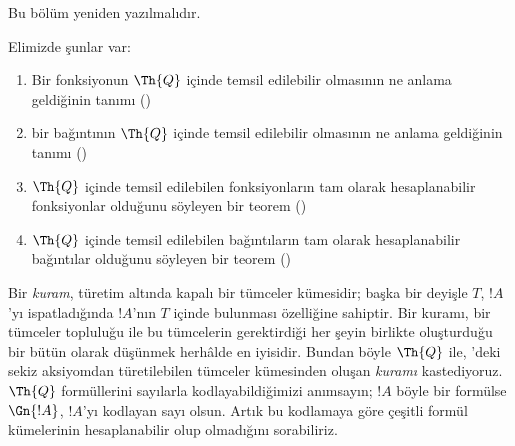 



\begin{editorial}
Bu bölüm yeniden yazılmalıdır.
\end{editorial}

Elimizde şunlar var:
\begin{enumerate}
\item Bir fonksiyonun $\Th{Q}$ içinde temsil edilebilir olmasının ne anlama
  geldiğinin tanımı ()
\item bir bağıntının $\Th{Q}$ içinde temsil edilebilir olmasının ne anlama
  geldiğinin tanımı ()
\item $\Th{Q}$ içinde temsil edilebilen fonksiyonların tam olarak
  hesaplanabilir fonksiyonlar olduğunu söyleyen bir teorem
  ()
\item $\Th{Q}$ içinde temsil edilebilen bağıntıların tam olarak
  hesaplanabilir bağıntılar olduğunu söyleyen bir teorem
  ()
\end{enumerate}

Bir {\em kuram}, türetim altında kapalı bir tümceler kümesidir; başka bir
deyişle $T$, $!A$'yı ispatladığında $!A$'nın $T$ içinde bulunması özelliğine
sahiptir. Bir kuramı, bir tümceler topluluğu ile bu tümcelerin gerektirdiği
her şeyin birlikte oluşturduğu bir bütün olarak düşünmek herhâlde en
iyisidir. Bundan böyle $\Th{Q}$ ile, 'deki sekiz
aksiyomdan türetilebilen tümceler kümesinden oluşan {\em kuramı}
kastediyoruz. $\Th{Q}$ formüllerini sayılarla kodlayabildiğimizi anımsayın;
$!A$ böyle bir formülse $\Gn{!A}$, $!A$'yı kodlayan sayı olsun. Artık bu
kodlamaya göre çeşitli formül kümelerinin hesaplanabilir olup olmadığını
sorabiliriz.

